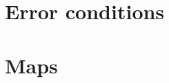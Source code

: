 \documentclass{article}
\newcommand{\arr}{\<arr>\;}
\newcommand{\alt}{\;|\;}
\begin{document}











\section{Error conditions}


\section{Maps}
\end{document}

